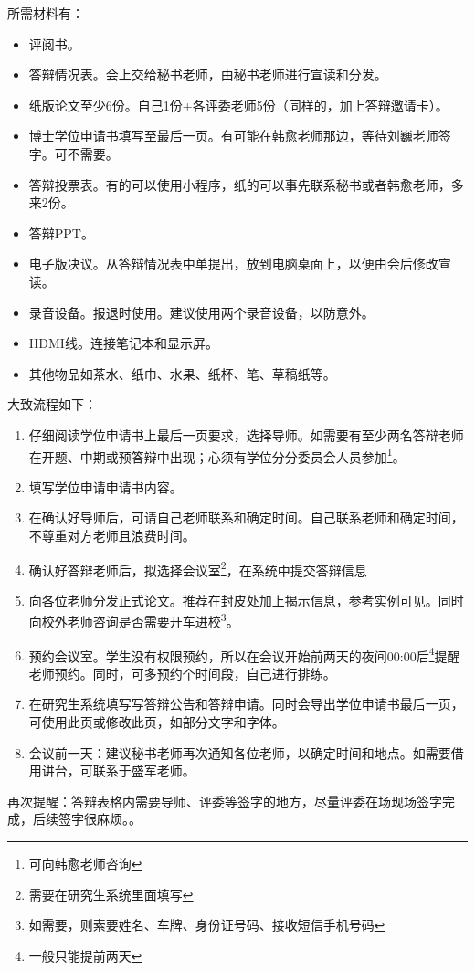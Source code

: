 \documentclass[12pt,a4paper]{ctexart}
\begin{document}
所需材料有：
\begin{itemize}[label=〇]
\item 评阅书。
\item 答辩情况表。会上交给秘书老师，由秘书老师进行宣读和分发。
\item 纸版论文至少6份。自己1份+各评委老师5份（同样的，加上答辩邀请卡）。
\item 博士学位申请书填写至最后一页。有可能在韩愈老师那边，等待刘巍老师签字。可不需要。
\item 答辩投票表。有的可以使用小程序，纸的可以事先联系秘书或者韩愈老师，多来2份。
\item 答辩PPT。
\item 电子版决议。从答辩情况表中单提出，放到电脑桌面上，以便由会后修改宣读。
\item 录音设备。报退时使用。建议使用两个录音设备，以防意外。
\item HDMI线。连接笔记本和显示屏。
\item 其他物品如茶水、纸巾、水果、纸杯、笔、草稿纸等。
\end{itemize}

大致流程如下：
\begin{enumerate}
\item 仔细阅读学位申请书上最后一页要求，选择导师。如需要有至少两名答辩老师在开题、中期或预答辩中出现；心须有学位分分委员会人员参加\footnote{可向韩愈老师咨询}。
\item 填写学位申请申请书内容。
\item 在确认好导师后，可请自己老师联系和确定时间。自己联系老师和确定时间，不尊重对方老师且浪费时间。
\item 确认好答辩老师后，拟选择会议室\footnote{需要在研究生系统里面填写}，在系统中提交答辩信息
\item 向各位老师分发正式论文。推荐在封皮处加上揭示信息，参考实例可见。同时向校外老师咨询是否需要开车进校\footnote{如需要，则索要姓名、车牌、身份证号码、接收短信手机号码}。
\item 预约会议室。学生没有权限预约，所以在会议开始前两天的夜间00:00后\footnote{一般只能提前两天}提醒老师预约。同时，可多预约个时间段，自己进行排练。
\item 在研究生系统填写写答辩公告和答辩申请。同时会导出学位申请书最后一页，可使用此页或修改此页，如部分文字和字体。
  \item 会议前一天：建议秘书老师再次通知各位老师，以确定时间和地点。如需要借用讲台，可联系于盛军老师。
\end{enumerate}

再次提醒：答辩表格内需要导师、评委等签字的地方，尽量评委在场现场签字完成，后续签字很麻烦。。
\end{document}
